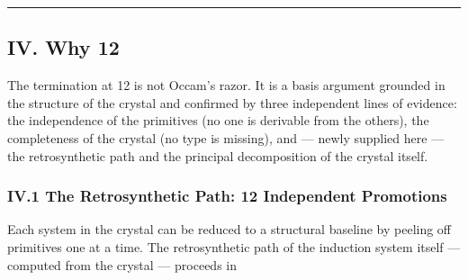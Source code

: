 \documentclass[12pt,a4paper]{article}
\makeatletter
\renewcommand{\_}{\ig@origunderscore\discretionary{}{}{}}
\makeatother
\begin{document}
\begin{center}
\rule{0.5\textwidth}{0.4pt}
\end{center}


\subsection{IV. Why 12}
The termination at 12 is not Occam's razor. It is a basis argument grounded in the structure of the crystal and
confirmed by three independent lines of evidence: the independence of the primitives (no one is derivable from the
others), the completeness of the crystal (no type is missing), and --- newly supplied here --- the retrosynthetic path
and the principal decomposition of the crystal itself.

\subsubsection{IV.1 The Retrosynthetic Path: 12 Independent Promotions}
Each system in the crystal can be reduced to a structural baseline by peeling off primitives one at a time. The
retrosynthetic path of the induction system itself --- computed from the crystal --- proceeds in
\end{document}

